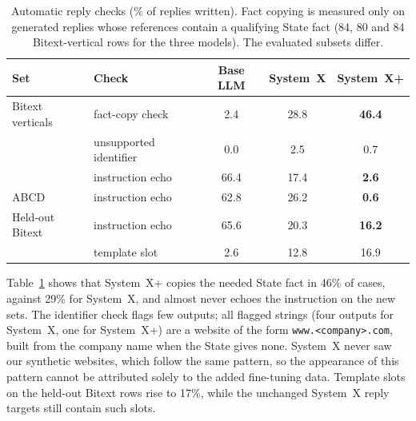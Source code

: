 \documentclass[11pt]{article}
\newcommand{\sysplus}{System~X+}
\begin{document}
\begin{table}[t]
\centering
\caption{Automatic reply checks (\% of replies written). Fact copying is measured only on generated replies whose references contain a qualifying State fact (84, 80 and 84 Bitext-vertical rows for the three models). The evaluated subsets differ.}
\label{tab:checks}
\small
\begin{tabular}{llccc}
\toprule
Set & Check & Base LLM & System~X & \sysplus{} \\
\midrule
Bitext verticals & fact-copy check & 2.4 & 28.8 & \textbf{46.4} \\
 & unsupported identifier & 0.0 & 2.5 & 0.7 \\
 & instruction echo & 66.4 & 17.4 & \textbf{2.6} \\
ABCD & instruction echo & 62.8 & 26.2 & \textbf{0.6} \\
Held-out Bitext & instruction echo & 65.6 & 20.3 & \textbf{16.2} \\
 & template slot & 2.6 & 12.8 & 16.9 \\
\bottomrule
\end{tabular}
\end{table}

Table~\ref{tab:checks} shows that \sysplus{} copies the needed State fact in 46\% of cases, against 29\% for System~X, and almost never echoes the instruction on the new sets. The identifier check flags few outputs; all flagged strings (four outputs for System~X, one for \sysplus{}) are a website of the form \texttt{www.<company>.com}, built from the company name when the State gives none. System~X never saw our synthetic websites, which follow the same pattern, so the appearance of this pattern cannot be attributed solely to the added fine-tuning data. Template slots on the held-out Bitext rows rise to 17\%, while the unchanged System~X reply targets still contain such slots.
\end{document}

